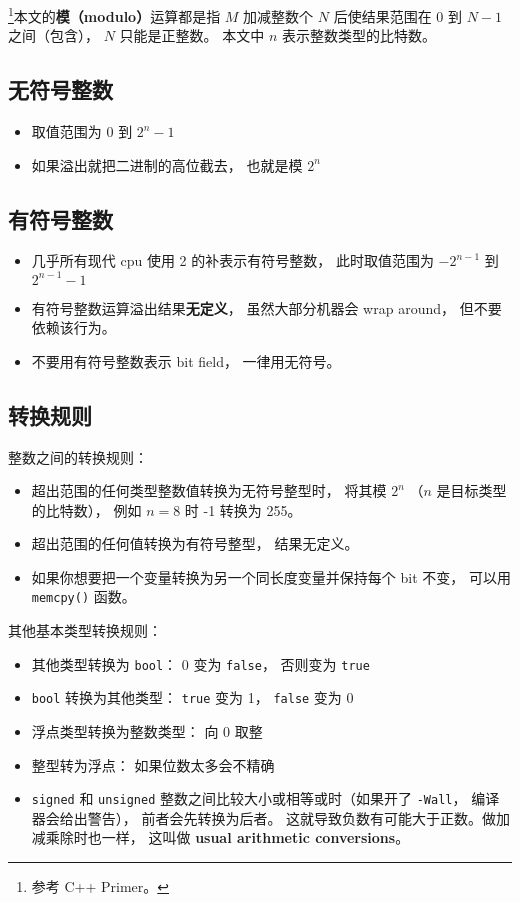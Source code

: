 

\footnote{参考 C++ Primer\cite{CppPr}。}本文的\textbf{模（modulo）}运算都是指 $M$ 加减整数个 $N$ 后使结果范围在 $0$ 到 $N-1$ 之间（包含）， $N$ 只能是正整数。 本文中 $n$ 表示整数类型的比特数。

\subsection{无符号整数}
\begin{itemize}
\item 取值范围为 $0$ 到 $2^n-1$
\item 如果溢出就把二进制的高位截去， 也就是模 $2^n$
\end{itemize}

\subsection{有符号整数}
\begin{itemize}
\item 几乎所有现代 cpu 使用 2 的补表示有符号整数， 此时取值范围为 $-2^{n-1}$ 到 $2^{n-1}-1$
\item 有符号整数运算溢出结果\textbf{无定义}， 虽然大部分机器会 wrap around， 但不要依赖该行为。
\item 不要用有符号整数表示 bit field， 一律用无符号。
\end{itemize}

\subsection{转换规则}
整数之间的转换规则：
\begin{itemize}
\item 超出范围的任何类型整数值转换为无符号整型时， 将其模 $2^n$ （$n$ 是目标类型的比特数）， 例如 $n = 8$ 时 -1 转换为 255。
\item 超出范围的任何值转换为有符号整型， 结果无定义。
\item 如果你想要把一个变量转换为另一个同长度变量并保持每个 bit 不变， 可以用 \verb|memcpy()| 函数。
\end{itemize}
其他基本类型转换规则：
\begin{itemize}
\item 其他类型转换为 \verb|bool|： 0 变为 \verb|false|， 否则变为 \verb|true|
\item \verb|bool| 转换为其他类型： \verb|true| 变为 1， \verb|false| 变为 0
\item 浮点类型转换为整数类型： 向 0 取整
\item 整型转为浮点： 如果位数太多会不精确
\item \verb|signed| 和 \verb|unsigned| 整数之间比较大小或相等或时（如果开了 \verb|-Wall|， 编译器会给出警告）， 前者会先转换为后者。 这就导致负数有可能大于正数。做加减乘除时也一样， 这叫做 \textbf{usual arithmetic conversions}。
\end{itemize}

